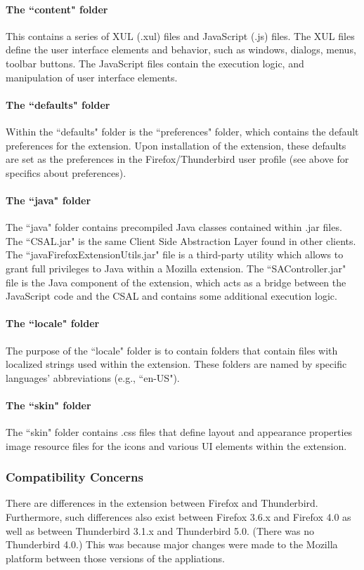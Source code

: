 \paragraph{The ``content" folder} This contains a series of XUL (.xul) files and JavaScript (.js) files. The XUL files define the user interface elements and behavior, such as windows, dialogs, menus, toolbar buttons. The JavaScript files contain the execution logic, and manipulation of user interface elements. 
\paragraph{The ``defaults" folder} Within the ``defaults" folder is the ``preferences" folder, which contains the default preferences for the extension. Upon installation of the extension, these defaults are set as the preferences in the Firefox/Thunderbird user profile (see above for specifics about preferences). 
\paragraph{The ``java" folder} The ``java" folder contains precompiled Java classes contained within .jar files. The ``CSAL.jar" is the same Client Side Abstraction Layer found in other clients. The ``javaFirefoxExtensionUtils.jar" file is a third-party utility which allows to grant full privileges to Java within a Mozilla extension. The ``SAController.jar" file is the Java component of the extension, which acts as a bridge between the JavaScript code and the CSAL and contains some additional execution logic. 
\paragraph{The ``locale" folder} The purpose of the ``locale" folder is to contain folders that contain files with localized strings used within the extension. These folders are named by specific languages' abbreviations (e.g., ``en-US"). 
\paragraph{The ``skin" folder} The ``skin" folder contains .css files that define layout and appearance properties image resource files for the icons and various UI elements within the extension.

\subsubsection{Compatibility Concerns}
There are differences in the extension between Firefox and Thunderbird. Furthermore, such differences also exist between Firefox 3.6.x and Firefox 4.0 as well as between Thunderbird 3.1.x and Thunderbird 5.0. (There was no Thunderbird 4.0.) This was because major changes were made to the Mozilla platform between those versions of the appliations. 

